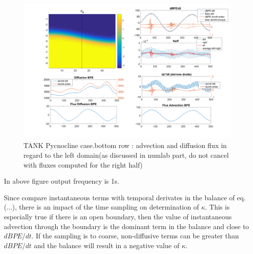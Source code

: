 \begin{figure}[h!]
\centering
\includegraphics[width=1\textwidth]{./CHAP_BPE/AGBPE_numlab7.png}
\caption{TANK Pycnocline case.bottom row : advection and diffusion flux in regard to the left domain(as discussed in numlab part, do not cancel with fluxes computed for the right half)}
\label{figCpsin}
\end{figure}

In above figure output frequency is 1s.

Since compare instantaneous terms with temporal derivates in the balance of eq.(...), there is an impact of the time sampling on determination of $\kappa$. This is especially true if there is an open boundary, then the value of instantaneous advection through the boundary is the dominant term in the balance and close to $dBPE/dt$. If the sampling is to coarse, non-diffusive terms can be greater than $dBPE/dt$ and the balance will result in a negative value of $\kappa$.


